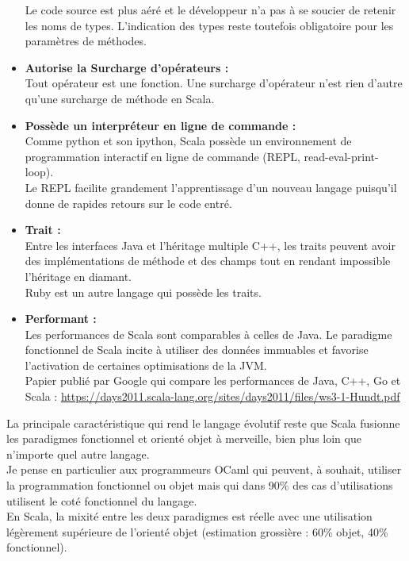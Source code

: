 \begin{itemize}
  Le code source est plus aéré et le développeur n'a pas à se soucier de retenir les
  noms de types.
  L'indication des types reste toutefois obligatoire pour les paramètres de
  méthodes.\\
\item[\textbullet]\textbf{Autorise la Surcharge d'opérateurs :}\\
  Tout opérateur est une fonction. Une surcharge d'opérateur n'est rien d'autre
  qu'une surcharge de méthode en Scala.\\
\item[\textbullet]\textbf{Possède un interpréteur en ligne de commande :}\\ 
  Comme python et son ipython, Scala possède un environnement de programmation
  interactif en ligne de commande (REPL, read-eval-print-loop).\\
  Le REPL facilite grandement l'apprentissage d'un nouveau langage puisqu'il
  donne de rapides retours sur le code entré.\\
\item[\textbullet]\textbf{Trait :}\\Entre les interfaces Java et l'héritage
  multiple C++, les traits peuvent avoir des implémentations de méthode et des
  champs tout en rendant impossible l'héritage en diamant.\\
  Ruby est un autre langage qui possède les traits.\\  
\item[\textbullet]\textbf{Performant :}\\Les performances de Scala sont comparables
  à celles de Java. Le paradigme fonctionnel de Scala incite à utiliser des
  données immuables et favorise l'activation de certaines optimisations de la
  JVM.\\
  Papier publié par Google qui compare les performances de Java, C++, Go et Scala :
  \url{https://days2011.scala-lang.org/sites/days2011/files/ws3-1-Hundt.pdf}\\
\end{itemize}


La principale caractéristique qui rend le langage évolutif reste que Scala
fusionne les paradigmes fonctionnel et orienté objet à merveille, bien plus loin
que n'importe quel autre langage.\\
Je pense en particulier aux programmeurs OCaml qui peuvent, à souhait, utiliser
la programmation fonctionnel ou objet mais qui dans 90\% des cas d'utilisations
utilisent le coté fonctionnel du langage.\\
En Scala, la mixité entre les deux paradigmes est réelle avec une utilisation
légèrement supérieure de l'orienté objet (estimation grossière : 60\% objet, 40\%
fonctionnel).\\


